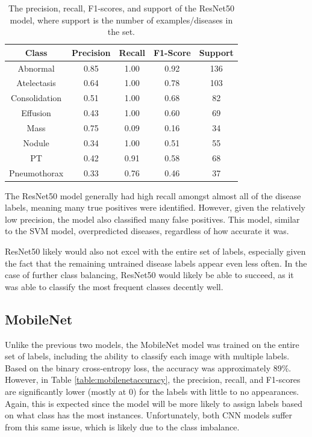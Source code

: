 \documentclass{article}
\theoremstyle{plain}
\theoremstyle{definition}
\theoremstyle{remark}
\begin{document}
\begin{table}[!h]
    \centering
    \begin{tabular}{ c  c  c  c  c }
        \hline
        \textbf{Class} & \textbf{Precision} & \textbf{Recall} & \textbf{F1-Score} & \textbf{Support}\\
        \hline
        Abnormal & 0.85 & 1.00 & 0.92 & 136 \\
        Atelectasis & 0.64 & 1.00 & 0.78 & 103 \\
        Consolidation & 0.51 & 1.00 & 0.68 & 82 \\
        Effusion & 0.43 & 1.00 & 0.60 & 69 \\
        Mass & 0.75 & 0.09 & 0.16 & 34 \\
        Nodule & 0.34 & 1.00 & 0.51 & 55 \\
        PT & 0.42 & 0.91 & 0.58 & 68 \\
        Pneumothorax & 0.33 & 0.76 & 0.46 & 37 \\
        \hline
    \end{tabular}
    \caption{The precision, recall, F1-scores, and support of the ResNet50 model, where support is
    the number of examples/diseases in the set.}
    \label{table:resnet50accuracy}
\end{table}

The ResNet50 model generally had high recall amongst almost all of the disease labels, meaning many
true positives were identified. However, given the relatively low precision, the model also
classified many false positives. This model, similar to the SVM model, overpredicted diseases,
regardless of how accurate it was.

ResNet50 likely would also not excel with the entire set of labels, especially given the fact
that the remaining untrained disease labels appear even less often. In the case of further class
balancing, ResNet50 would likely be able to succeed, as it was able to classify the most frequent
classes decently well.

\subsection{MobileNet}
\label{section:resultmobilenet}
Unlike the previous two models, the MobileNet model was trained on the entire set of labels,
including the ability to classify each image with multiple labels. Based on the binary cross-entropy
loss, the accuracy was approximately 89\%. However, in Table \ref{table:mobilenetaccuracy}, the
precision, recall, and F1-scores are significantly lower (mostly at 0) for the labels with little
to no appearances. Again, this is expected since the model will be more likely to assign labels
based on what class has the most instances. Unfortunately, both CNN models suffer from this same
issue, which is likely due to the class imbalance. 
\end{document}
